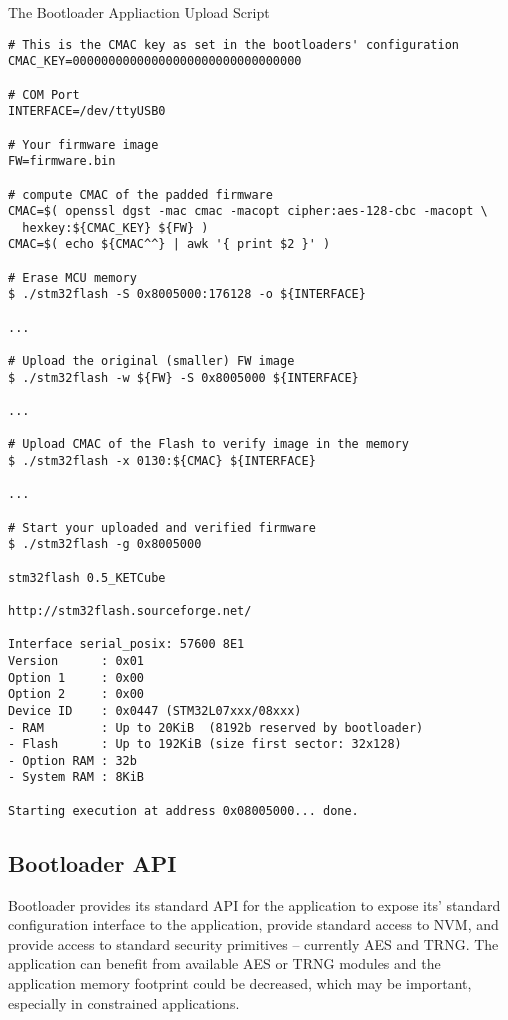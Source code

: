 \begin{docCodeExampleTitled}{The Bootloader Appliaction Upload Script}
\begin{verbatim}
# This is the CMAC key as set in the bootloaders' configuration
CMAC_KEY=00000000000000000000000000000000

# COM Port
INTERFACE=/dev/ttyUSB0

# Your firmware image
FW=firmware.bin

# compute CMAC of the padded firmware
CMAC=$( openssl dgst -mac cmac -macopt cipher:aes-128-cbc -macopt \ 
  hexkey:${CMAC_KEY} ${FW} )
CMAC=$( echo ${CMAC^^} | awk '{ print $2 }' )

# Erase MCU memory
$ ./stm32flash -S 0x8005000:176128 -o ${INTERFACE}

...

# Upload the original (smaller) FW image
$ ./stm32flash -w ${FW} -S 0x8005000 ${INTERFACE}

...

# Upload CMAC of the Flash to verify image in the memory
$ ./stm32flash -x 0130:${CMAC} ${INTERFACE}

...

# Start your uploaded and verified firmware
$ ./stm32flash -g 0x8005000

stm32flash 0.5_KETCube

http://stm32flash.sourceforge.net/

Interface serial_posix: 57600 8E1
Version      : 0x01
Option 1     : 0x00
Option 2     : 0x00
Device ID    : 0x0447 (STM32L07xxx/08xxx)
- RAM        : Up to 20KiB  (8192b reserved by bootloader)
- Flash      : Up to 192KiB (size first sector: 32x128)
- Option RAM : 32b
- System RAM : 8KiB

Starting execution at address 0x08005000... done.
\end{verbatim}
\end{docCodeExampleTitled}


\clearpage
\subsection{Bootloader API} \label{sec:app:api}

Bootloader provides its standard API for the application to expose its' standard configuration interface to the application,
provide standard access to NVM, and provide access to standard security primitives -- currently AES and TRNG. 
The application can benefit from available AES or TRNG modules and the application memory footprint could be decreased, which may be important, especially in constrained applications.

